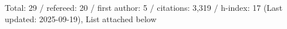 Total: 29 / refereed: 20 / first author: 5 / citations: 3,319 / h-index: 17 (Last updated: 2025-09-19), List attached below